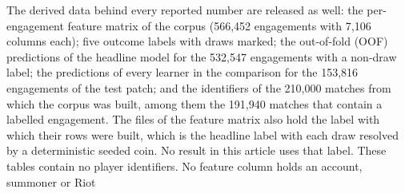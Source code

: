 The derived data behind every reported number are released as well: the per-engagement feature
matrix of the corpus (566,452 engagements with 7,106 columns each); five outcome labels with draws
marked; the out-of-fold (OOF) predictions of the headline model for the 532,547 engagements with a
non-draw label; the predictions of every learner in the comparison for the 153,816 engagements of
the test patch; and the identifiers of the 210,000 matches from which the corpus was built, among
them the 191,940 matches that contain a labelled engagement. The files of the feature matrix also
hold the label with which their rows were built, which is the headline label with each draw resolved
by a deterministic seeded coin. No result in this article uses that label.
These tables contain no player identifiers. No feature column holds an account, summoner or Riot
